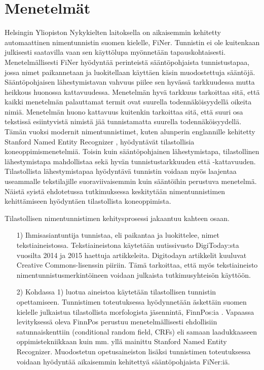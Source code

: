 \documentclass[12pt,a4paper,finnish,oneside]{article}
\begin{document}
\section{Menetelmät}

Helsingin Yliopiston Nykykielten laitoksella on aikaisemmin kehitetty automaattinen nimentunnistin suomen kielelle, FiNer. Tunnistin ei ole kuitenkaan julkisesti saatavilla vaan sen käyttölupa myönnetään tapauskohtaisesti. Menetelmällisesti FiNer hyödyntää perinteistä sääntöpohjaista tunnistustapaa, jossa nimet paikannetaan ja luokitellaan käyttäen käsin muodostettuja sääntöjä. Sääntöpohjaisen lähestymistavan vahvuus piilee sen hyvässä tarkkuudessa mutta heikkous huonossa kattavuudessa. Menetelmän hyvä tarkkuus tarkoittaa sitä, että kaikki menetelmän palauttamat termit ovat suurella todennäköisyydellä oikeita nimiä. Menetelmän huono kattavuus kuitenkin tarkoittaa sitä, että suuri osa tekstissä esiintyvistä nimistä jää tunnistamatta suurella todennäköisyydellä. Tämän vuoksi modernit nimentunnistimet, kuten alunperin englannille kehitetty Stanford Named Entity Recognizer \cite{stanfordner}, hyödyntävät tilastollisia koneoppimismenetelmiä. Toisin kuin sääntöpohjainen lähestymistapa, tilastollinen lähestymistapa mahdollistaa sekä hyvän tunnistustarkkuuden että -kattavuuden. Tilastollista lähestymistapaa hyödyntävä tunnistin voidaan myös laajentaa useammalle tekstilajille suoraviivaisemmin kuin sääntöihin perustuva menetelmä. Näistä syistä ehdotetussa tutkimuksessa keskitytään nimentunnistimen kehittämiseen hyödyntäen tilastollista koneoppimista.

Tilastollisen nimentunnistimen kehitysprosessi jakaantuu kahteen osaan. 

\begin{itemize}

\item[1)] Ihmisasiantuntija tunnistaa, eli paikantaa ja luokittelee, nimet tekstiaineistossa. Tekstiaineistona käytetään uutissivusto DigiToday:sta vuosilta 2014 ja 2015 haettuja artikkeleita. Digitodayn artikkelit kuuluvat Creative Commons-lisenssin piiriin. Tämä tarkoittaa, että myös tekstiaineisto nimentunnistusmerkintöineen voidaan julkaista tutkimusyhteisön käyttöön.

\item[2)] Kohdassa 1) luotua aineistoa käytetään tilastollisen tunnistin opettamiseen. Tunnistimen toteutuksessa hyödynnetään äskettäin suomen kielelle julkaistua tilastollista morfologista jäsennintä, FinnPos:ia \cite{silfverberg2015}\cite{finnpos}. Vapaassa levityksessä oleva FinnPos perustuu menetelmällisesti ehdollisiin satunnaiskenttiin (conditional random field, CRFs) eli samaan laadukkaaseen oppimistekniikkaan kuin mm. yllä mainittu Stanford Named Entity Recognizer. Muodostetun opetusaineiston lisäksi tunnistimen toteutuksessa voidaan hyödyntää aikaisemmin kehitettyä sääntöpohjaista FiNer:iä.

\end{itemize}
\end{document}

